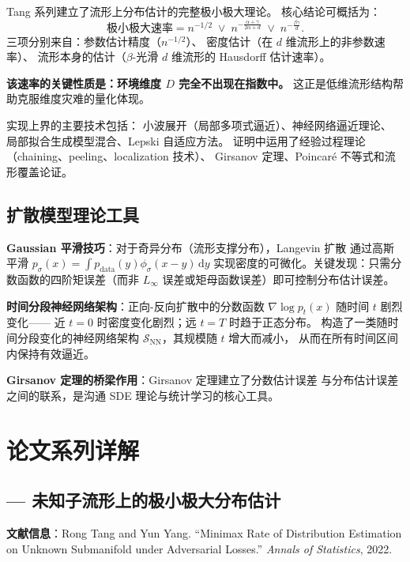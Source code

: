 \documentclass[12pt]{amsbook}
\theoremstyle{plain}
\begin{document}
Tang 系列建立了流形上分布估计的完整极小极大理论。
核心结论可概括为：
\[
\text{极小极大速率} = n^{-1/2} \;\vee\;
n^{-\frac{\alpha+\gamma}{2\alpha+d}} \;\vee\;
n^{-\frac{\beta\gamma}{d}}.
\]
三项分别来自：参数估计精度（$n^{-1/2}$）、
密度估计（在 $d$ 维流形上的非参数速率）、
流形本身的估计（$\beta$-光滑 $d$ 维流形的 Hausdorff 估计速率）。

\textbf{该速率的关键性质是：环境维度 $D$ 完全不出现在指数中。}
这正是低维流形结构帮助克服维度灾难的量化体现。

实现上界的主要技术包括：
小波展开（局部多项式逼近）、神经网络逼近理论、
局部拟合生成模型混合、Lepski 自适应方法。
证明中运用了经验过程理论（chaining、peeling、localization 技术）、
Girsanov 定理、Poincaré 不等式和流形覆盖论证。

\subsection{扩散模型理论工具}\label{sec:tang-diffusion-tools}

\textbf{Gaussian 平滑技巧}：对于奇异分布（流形支撑分布），Langevin 扩散
通过高斯平滑 $p_{\sigma}(x) = \int p_{\mathrm{data}}(y) \phi_\sigma(x-y) \, \mathrm{d}y$
实现密度的可微化。关键发现：只需分数函数的四阶矩误差（而非 $L_\infty$
误差或矩母函数误差）即可控制分布估计误差。

\textbf{时间分段神经网络架构}：正向-反向扩散中的分数函数
$\nabla \log p_t(x)$ 随时间 $t$ 剧烈变化——
近 $t=0$ 时密度变化剧烈；远 $t=T$ 时趋于正态分布。
\citep{tang2024diffusion} 构造了一类随时间分段变化的神经网络架构
$\mathcal{S}_{\mathrm{NN}}$，其规模随 $t$ 增大而减小，
从而在所有时间区间内保持有效逼近。

\textbf{Girsanov 定理的桥梁作用}：Girsanov 定理建立了分数估计误差
与分布估计误差之间的联系，是沟通 SDE 理论与统计学习的核心工具。

\section{论文系列详解}\label{sec:tang-papers}

\subsection{\citep{tang2022minimax} --- 未知子流形上的极小极大分布估计}
\label{sec:tang-annals2022}

\textbf{文献信息}：Rong Tang and Yun Yang.
``Minimax Rate of Distribution Estimation on Unknown Submanifold under
Adversarial Losses.'' \textit{Annals of Statistics}, 2022.
\end{document}
